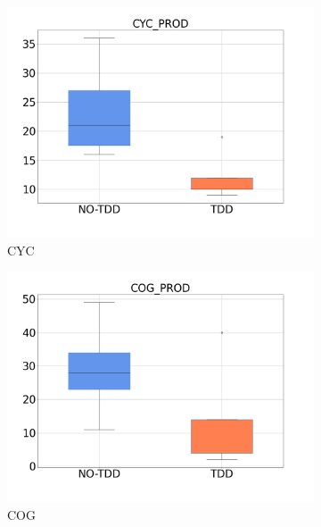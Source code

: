 \begin{figure}[H]
    \medskip
    \begin{subfigure}{0.33\textwidth}
        \includegraphics[width=\linewidth]{figures/box_plots/task2/CYC.png}
        \caption{CYC}
        \label{bp_task2_cyc}
    \end{subfigure}\hfil
    \begin{subfigure}{0.33\textwidth}
        \includegraphics[width=\linewidth]{figures/box_plots/task2/COG.png}
        \caption{COG}
        \label{bp_task2_cog}
    \end{subfigure}\hfil
    \begin{subfigure}{0.33\textwidth}

\end{subfigure}
\end{figure}
